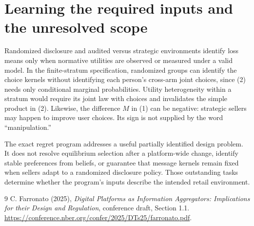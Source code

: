 \documentclass[11pt]{article}
\theoremstyle{definition}
\begin{document}
\section*{Learning the required inputs and the unresolved scope}
Randomized disclosure and audited versus strategic environments identify
loss means only when normative utilities are observed or measured under
a valid model. In the finite-stratum specification, randomized groups
can identify the choice kernels without identifying each person's
cross-arm joint choices, since (2) needs only conditional marginal
probabilities. Utility heterogeneity within a stratum would require its
joint law with choices and invalidates the simple product in (2).
Likewise, the difference $M$ in (1) can be negative: strategic sellers
may happen to improve user choices. Its sign is not supplied by the word
``manipulation.''

The exact regret program addresses a useful partially identified design
problem. It does not resolve equilibrium selection after a platform-wide
change, identify stable preferences from beliefs, or guarantee that message
kernels remain fixed when sellers adapt to a randomized disclosure policy.
Those outstanding tasks determine whether the program's inputs describe
the intended retail environment.
\begin{thebibliography}{9}
 C. Farronato (2025), \emph{Digital Platforms as
Information Aggregators: Implications for their Design and Regulation},
conference draft, Section 1.1.
\url{https://conference.nber.org/confer/2025/DTs25/farronato.pdf}.
\end{thebibliography}
\end{document}
